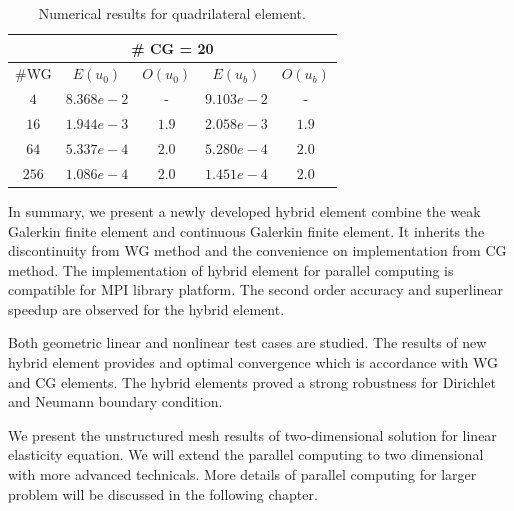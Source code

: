    	
   	\begin{table}[h]
   		\setlength{\tabcolsep}{2pt} {
   			\caption{ Numerical results for quadrilateral element.}
   			\label{Tab:hwgcg l1}
   			\vspace{-5pt}
   			\begin{center}
   				\begin{tabular}{c|c|c|c|c}
   					\hline
   					\multicolumn{5}{c}{\# CG = 20} \\
   					\hline
   					\#WG & $ E (u_{0}) $ & $ O(u_{0}) $ & $ E(u_{b})  $& $ O(u_{b})  $\\
   					\hline
   					$ 4 $ & $ 8.368e-2 $ & - & $ 9.103e-2 $ & - \\
   					\hline
   					$ 16 $ & $ 1.944e-3 $ & $ 1.9 $& $ 2.058e-3 $ & $ 1.9 $ \\
   					\hline
   					$ 64 $ & $ 5.337e-4 $ & $ 2.0 $ & $ 5.280e-4 $ & $ 2.0 $ \\
   					\hline
   					$ 256 $ & $ 1.086e-4 $ & $ 2.0 $ & $ 1.451e-4 $ & $ 2.0 $\\
   					\hline
   				\end{tabular}
   			\end{center} }
   		\end{table}
   		
   		\vspace{5mm}
   		
   		In summary, we present a newly developed hybrid element combine the weak Galerkin finite element and continuous Galerkin finite element. It inherits the discontinuity from WG method and the convenience on implementation from CG method. The implementation of hybrid element for parallel computing is compatible for MPI library platform. The second order accuracy and superlinear speedup are observed for the hybrid element. 
   		
   		Both geometric linear and nonlinear test cases are studied. The results of new hybrid element provides and optimal convergence which is accordance with WG and CG elements. The hybrid elements proved a strong robustness for Dirichlet and Neumann boundary condition.
   		
   		We present the unstructured mesh results of two-dimensional solution for linear elasticity equation. We will extend the parallel computing to two dimensional with more advanced technicals. More details of parallel computing for larger problem will be discussed in the following chapter.